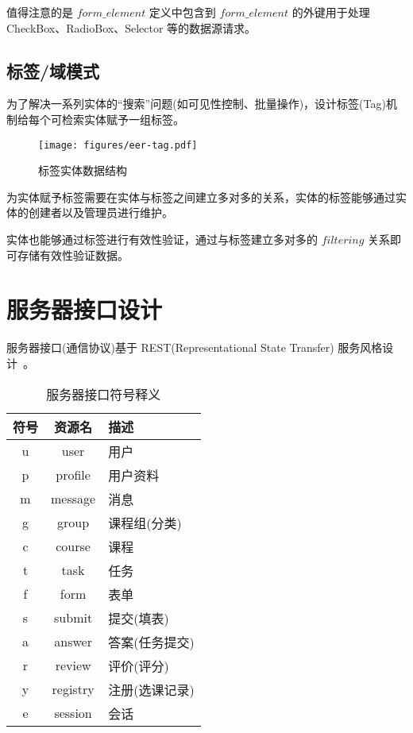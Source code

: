 值得注意的是 $form\_element$ 定义中包含到 $form\_element$ 的外键用于处理 CheckBox、RadioBox、Selector 等的数据源请求。

\subsection{标签/域模式}

为了解决一系列实体的“搜索”问题(如可见性控制、批量操作)，设计标签(Tag)机制给每个可检索实体赋予一组标签。

\begin{figure}[!h]
  \begin{center}
    \texttt{[image: figures/eer-tag.pdf]}
    \caption{标签实体数据结构\label{DatabaseEntityTag}}
  \end{center}
\end{figure}

为实体赋予标签需要在实体与标签之间建立多对多的关系，实体的标签能够通过实体的创建者以及管理员进行维护。

实体也能够通过标签进行有效性验证，通过与标签建立多对多的 $filtering$ 关系即可存储有效性验证数据。

\newpage

\section{服务器接口设计\label{sec:ServerAPI}}

服务器接口(通信协议)基于 REST(Representational State Transfer) 服务风格设计~\cite{fielding2002principled}。

\begin{table}[!h]
  \begin{center}
    \noindent
    \ttfamily
    \begin{tabular}{|c|c|l|}
      \hline
      \textbf{符号} & \textbf{资源名} & \textbf{描述} \\ \hline
      u & user      & 用户          \\ \hline
      p & profile   & 用户资料      \\ \hline
      m & message   & 消息          \\ \hline
      g & group     & 课程组(分类)  \\ \hline
      c & course    & 课程          \\ \hline
      t & task      & 任务          \\ \hline
      f & form      & 表单          \\ \hline
      s & submit    & 提交(填表)    \\ \hline
      a & answer    & 答案(任务提交)\\ \hline
      r & review    & 评价(评分)    \\ \hline
      y & registry  & 注册(选课记录)\\ \hline
      e & session   & 会话          \\ \hline
    \end{tabular}
    \caption{服务器接口符号释义\label{APURIGlossary}}
  \end{center}
\end{table}

